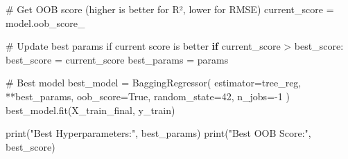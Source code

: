 \documentclass[
  letterpaper,
  DIV=11,
  numbers=noendperiod]{scrreprt}
\newenvironment{Shaded}{\begin{snugshade}}{\end{snugshade}}
\newcommand{\BuiltInTok}[1]{\textcolor[rgb]{0.00,0.23,0.31}{#1}}
\newcommand{\CommentTok}[1]{\textcolor[rgb]{0.37,0.37,0.37}{#1}}
\newcommand{\ControlFlowTok}[1]{\textcolor[rgb]{0.00,0.23,0.31}{\textbf{#1}}}
\newcommand{\DecValTok}[1]{\textcolor[rgb]{0.68,0.00,0.00}{#1}}
\newcommand{\NormalTok}[1]{\textcolor[rgb]{0.00,0.23,0.31}{#1}}
\newcommand{\OperatorTok}[1]{\textcolor[rgb]{0.37,0.37,0.37}{#1}}
\newcommand{\StringTok}[1]{\textcolor[rgb]{0.13,0.47,0.30}{#1}}
\newcommand{\VariableTok}[1]{\textcolor[rgb]{0.07,0.07,0.07}{#1}}
\begin{document}
\begin{Shaded}
\begin{Highlighting}[]
    \CommentTok{\# Get OOB score (higher is better for R², lower for RMSE)}
\NormalTok{    current\_score }\OperatorTok{=}\NormalTok{ model.oob\_score\_}
    
    \CommentTok{\# Update best params if current score is better}
    \ControlFlowTok{if}\NormalTok{ current\_score }\OperatorTok{\textgreater{}}\NormalTok{ best\_score:}
\NormalTok{        best\_score }\OperatorTok{=}\NormalTok{ current\_score}
\NormalTok{        best\_params }\OperatorTok{=}\NormalTok{ params}

\CommentTok{\# Best model}
\NormalTok{best\_model }\OperatorTok{=}\NormalTok{ BaggingRegressor(}
\NormalTok{    estimator}\OperatorTok{=}\NormalTok{tree\_reg,}
    \OperatorTok{**}\NormalTok{best\_params,}
\NormalTok{    oob\_score}\OperatorTok{=}\VariableTok{True}\NormalTok{,}
\NormalTok{    random\_state}\OperatorTok{=}\DecValTok{42}\NormalTok{,}
\NormalTok{    n\_jobs}\OperatorTok{={-}}\DecValTok{1}
\NormalTok{)}
\NormalTok{best\_model.fit(X\_train\_final, y\_train)}

\BuiltInTok{print}\NormalTok{(}\StringTok{"Best Hyperparameters:"}\NormalTok{, best\_params)}
\BuiltInTok{print}\NormalTok{(}\StringTok{"Best OOB Score:"}\NormalTok{, best\_score)}
\end{Highlighting}
\end{Shaded}
\end{document}
